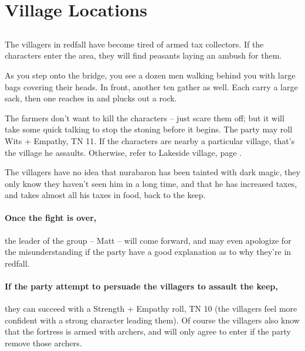 \section{Village Locations}

\subsection{}

\begin{multicols}{2}


\noindent The villagers in \gls{redfall} have become tired of armed tax collectors.  If the characters enter the area, they will find peasants laying an ambush for them.

\begin{boxtext}

	As you step onto the bridge, you see a dozen men walking behind you with large bags covering their heads.  In front, another ten gather as well.  Each carry a large sack, then one reaches in and plucks out a rock.

\end{boxtext}

The farmers don't want to kill the characters -- just scare them off; but it will take some quick talking to stop the stoning before it begins.  The party may roll Wits + Empathy, TN 11.
If the characters are nearby a particular village, that's the village he assaults.
Otherwise, refer to Lakeside village, page \pageref{lakeside}.

The villagers have no idea that \gls{nurabaron} has been tainted with dark magic, they only know they haven't seen him in a long time, and that he has increased taxes, and takes almost all his taxes in food, back to the keep.


\paragraph{Once the fight is over,}
the leader of the group -- Matt -- will come forward, and may even apologize for the misunderstanding if the party have a good explanation as to why they're in \gls{redfall}.

\paragraph{If the party attempt to persuade the villagers to assault the keep,}
they can succeed with a Strength + Empathy roll, TN 10
(the villagers feel more confident with a strong character leading them).
Of course the villagers also know that the fortress is armed with archers, and will only agree to enter if the party remove those archers.


\end{multicols}
